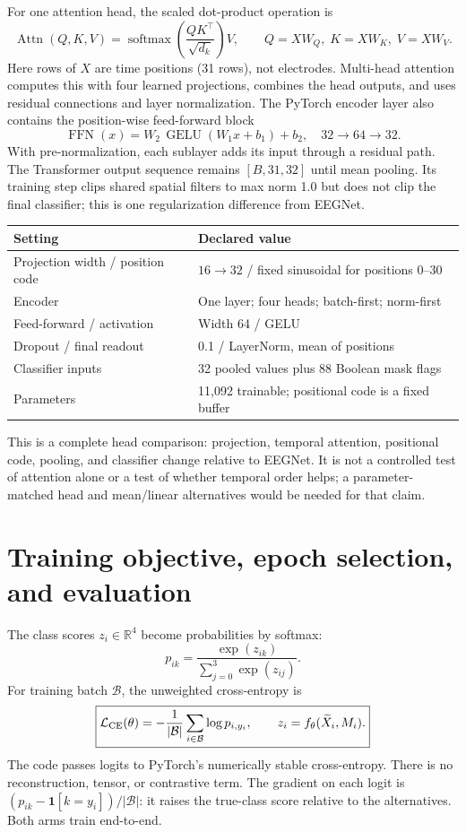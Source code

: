 \documentclass[11pt,a4paper]{article}
\begin{document}
For one attention head, the scaled dot-product operation is
\[
 \operatorname{Attn}(Q,K,V)=
 \operatorname{softmax}\!\left(\frac{QK^\top}{\sqrt{d_k}}\right)V,
 \qquad Q=XW_Q,\;K=XW_K,\;V=XW_V.
\]
Here rows of $X$ are time positions (31 rows), not electrodes. Multi-head
attention computes this with four learned projections, combines the head
outputs, and uses residual connections and layer normalization. The PyTorch
encoder layer also contains the position-wise feed-forward block
\[
 \operatorname{FFN}(x)=W_2\,\operatorname{GELU}(W_1x+b_1)+b_2,
 \quad 32\to64\to32.
\]
With pre-normalization, each sublayer adds its input through a residual path.
The Transformer output sequence remains $[B,31,32]$ until mean pooling. Its
training step clips shared spatial filters to max norm 1.0 but does not clip
the final classifier; this is one regularization difference from EEGNet.

\begin{tabularx}{\linewidth}{@{}L{47mm}Y@{}}
\toprule
Setting & Declared value \\
\midrule
Projection width / position code & $16\to32$ / fixed sinusoidal for positions 0--30 \\
Encoder & One layer; four heads; batch-first; norm-first \\
Feed-forward / activation & Width 64 / GELU \\
Dropout / final readout & 0.1 / LayerNorm, mean of positions \\
Classifier inputs & 32 pooled values plus 88 Boolean mask flags \\
Parameters & 11,092 trainable; positional code is a fixed buffer \\
\bottomrule
\end{tabularx}

This is a complete head comparison: projection, temporal attention, positional
code, pooling, and classifier change relative to EEGNet. It is not a controlled
test of attention alone or a test of whether temporal order helps; a parameter-
matched head and mean/linear alternatives would be needed for that claim.

\newpage
\section{Training objective, epoch selection, and evaluation}
The class scores $z_i\in\mathbb R^4$ become probabilities by softmax:
\[
 p_{ik}=\frac{\exp(z_{ik})}{\sum_{j=0}^{3}\exp(z_{ij})}.
\]
For training batch $\mathcal B$, the unweighted cross-entropy is
\[
 \boxed{\mathcal L_{\rm CE}(\theta)=-\frac1{|\mathcal B|}
 \sum_{i\in\mathcal B}\log p_{i,y_i},\qquad
 z_i=f_\theta(\widetilde X_i,M_i).}
\]
The code passes logits to PyTorch's numerically stable cross-entropy. There is
no reconstruction, tensor, or contrastive term. The gradient on each logit is
$(p_{ik}-\mathbf1[k=y_i])/|\mathcal B|$: it raises the true-class score
relative to the alternatives. Both arms train end-to-end.
\end{document}

